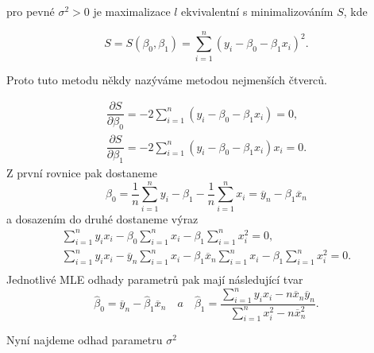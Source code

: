 \documentclass[oneside,intlimits,reqno]{scrbook}
\theoremstyle{definition}
\theoremstyle{plain}
\theoremstyle{remark}
\begin{document}
pro pevné $ \sigma^{2} > 0 $ je maximalizace $ l $ ekvivalentní s minimalizováním $ S $, kde

\begin{equation}
S = S ( \beta_{0} , \beta_{1} ) = \sum_{i = 1}^{n}( y_{i} -  \beta_{0}  - \beta_{1} x_{i})^{2}.
\end{equation}

Proto tuto metodu někdy nazýváme metodou nejmenších čtverců.

\begin{equation}
\begin{aligned}
\dfrac{\partial S}{\partial \beta_{0}} = - 2 \sum_{i = 1}^{n}( y_{i} -  \beta_{0}  - \beta_{1} x_{i}) = 0 , \\
\dfrac{\partial S}{\partial \beta_{1}} = - 2 \sum_{i = 1}^{n}( y_{i} -  \beta_{0}  - \beta_{1} x_{i}) x_{i}= 0 .
\end{aligned}
\end{equation}
Z první rovnice pak dostaneme
\begin{equation}
 \beta_{0} = \dfrac{1}{n} \sum_{i = 1}^{n} y_{i} -  \beta_{1}  - \dfrac{1}{n} \sum_{i = 1}^{n} x_{i} = \overline{y}_{n} - \beta_{1} \overline{x}_{n}
\end{equation}
a dosazením do druhé dostaneme výraz
\begin{equation}
\begin{aligned}
\sum_{i=1}^{n} y_{i} x_{i} - \beta_{0} \sum_{i=1}^{n} x_{i} - \beta_{1} \sum_{i=1}^{n} x_{i}^{2} = 0 , \\
\sum_{i=1}^{n} y_{i} x_{i} - \overline{y}_{n} \sum_{i=1}^{n} x_{i} - \beta_{1} \overline{x}_{n} \sum_{i=1}^{n} x_{i} - \beta_{1} \sum_{i=1}^{n} x_{i}^{2} = 0. \\
\end{aligned}
\end{equation}
Jednotlivé MLE odhady parametrů pak mají následující tvar
\begin{equation}
\widehat{\beta}_{0} = \overline{y}_{n} - \widehat{\beta}_{1} \overline{x}_{n} \quad a \quad
\widehat{\beta}_{1} = \dfrac{\sum_{i=1}^{n} y_{i} x_{i} - n \overline{x}_{n} \overline{y}_{n}}{\sum_{i=1}^{n} x_{i}^{2} - n \overline{x}_{n}^{2}}.
\end{equation}

Nyní najdeme odhad parametru $ \sigma^{2} $ 
\end{document}
